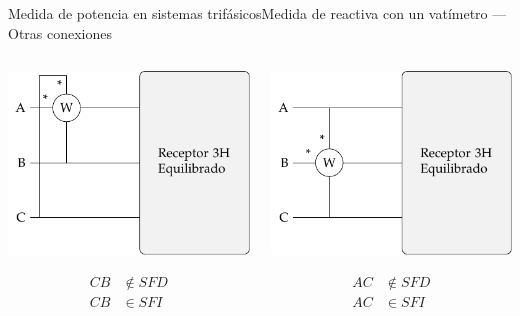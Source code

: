 \documentclass[aspectratio=169, xcolor={usenames,svgnames,dvipsnames}]{beamer}
\begin{document}
\begin{frame}{Medida de potencia en sistemas trifásicos}{Medida de reactiva con un vatímetro --- Otras conexiones}
\begin{columns}
\begin{column}{0.33\columnwidth}
\begin{center}
\includegraphics[height=0.25\textheight]{../figs/Reactiva3H_A-CB.pdf}
\end{center}
\begin{align*}
  CB &\notin SFD\\
  CB &\in SFI
\end{align*}
\end{column}
\begin{column}{0.33\columnwidth}
\begin{center}
\includegraphics[height=0.25\textheight]{../figs/Reactiva3H_B-AC.pdf}
\end{center}
\begin{align*}
  AC &\notin SFD\\
  AC &\in SFI
\end{align*}

\end{column}
\end{columns}
\end{frame}
\end{document}
